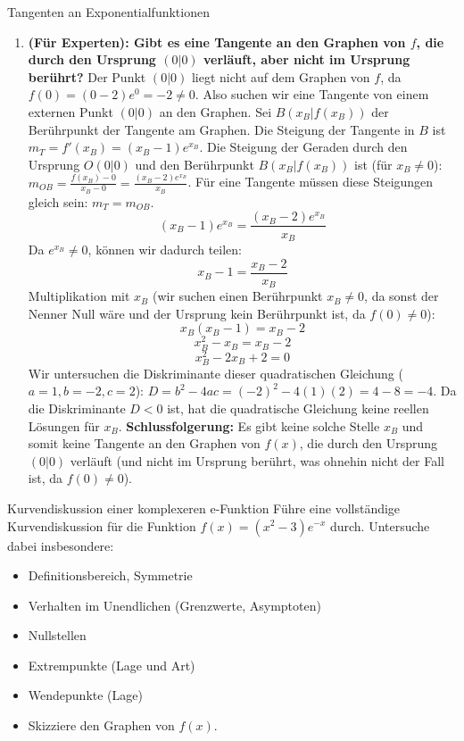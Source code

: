 \begin{loesungsumgebung}{Tangenten an Exponentialfunktionen}
\begin{enumerate}[label=(\alph*)]
    \item \textbf{(Für Experten): Gibt es eine Tangente an den Graphen von $f$, die durch den Ursprung $(0|0)$ verläuft, aber nicht im Ursprung berührt?}
    Der Punkt $(0|0)$ liegt nicht auf dem Graphen von $f$, da $f(0) = (0-2)e^0 = -2 \neq 0$. Also suchen wir eine Tangente von einem externen Punkt $(0|0)$ an den Graphen.
    Sei $B(x_B | f(x_B))$ der Berührpunkt der Tangente am Graphen. Die Steigung der Tangente in $B$ ist $m_T = f'(x_B) = (x_B-1)e^{x_B}$.
    Die Steigung der Geraden durch den Ursprung $O(0|0)$ und den Berührpunkt $B(x_B | f(x_B))$ ist (für $x_B \neq 0$):
    $m_{OB} = \frac{f(x_B) - 0}{x_B - 0} = \frac{(x_B-2)e^{x_B}}{x_B}$.
    Für eine Tangente müssen diese Steigungen gleich sein: $m_T = m_{OB}$.
    $$ (x_B-1)e^{x_B} = \frac{(x_B-2)e^{x_B}}{x_B} $$
    Da $e^{x_B} \neq 0$, können wir dadurch teilen:
    $$ x_B-1 = \frac{x_B-2}{x_B} $$
    Multiplikation mit $x_B$ (wir suchen einen Berührpunkt $x_B \neq 0$, da sonst der Nenner Null wäre und der Ursprung kein Berührpunkt ist, da $f(0) \neq 0$):
    $$ x_B(x_B-1) = x_B-2 $$
    $$ x_B^2 - x_B = x_B - 2 $$
    $$ x_B^2 - 2x_B + 2 = 0 $$
    Wir untersuchen die Diskriminante dieser quadratischen Gleichung ($a=1, b=-2, c=2$):
    $D = b^2 - 4ac = (-2)^2 - 4(1)(2) = 4 - 8 = -4$.
    Da die Diskriminante $D < 0$ ist, hat die quadratische Gleichung keine reellen Lösungen für $x_B$.
    \textbf{Schlussfolgerung:} Es gibt keine solche Stelle $x_B$ und somit keine Tangente an den Graphen von $f(x)$, die durch den Ursprung $(0|0)$ verläuft (und nicht im Ursprung berührt, was ohnehin nicht der Fall ist, da $f(0)\neq0$).
\end{enumerate}

\end{loesungsumgebung}

\begin{aufgabenumgebung}{Kurvendiskussion einer komplexeren e-Funktion}
Führe eine vollständige Kurvendiskussion für die Funktion $f(x) = (x^2 - 3)e^{-x}$ durch. Untersuche dabei insbesondere:
\begin{itemize}
    \item Definitionsbereich, Symmetrie
    \item Verhalten im Unendlichen (Grenzwerte, Asymptoten)
    \item Nullstellen
    \item Extrempunkte (Lage und Art)
    \item Wendepunkte (Lage)
    \item Skizziere den Graphen von $f(x)$.
\end{itemize}
\end{aufgabenumgebung}

